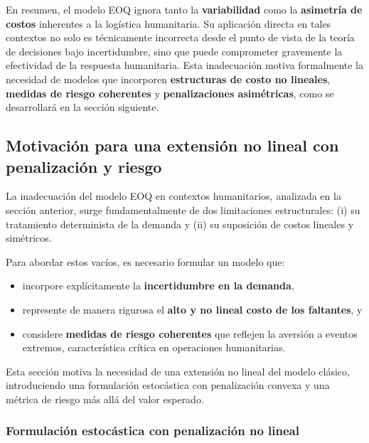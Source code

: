 \documentclass[
  spanish,
  us-letterpaper,
]{scrreprt}
\providecommand{\tightlist}{%
  \setlength{\itemsep}{0pt}\setlength{\parskip}{0pt}}
\numberwithin{equation}{section}
\begin{document}
En resumen, el modelo EOQ ignora tanto la \textbf{variabilidad} como la
\textbf{asimetría de costos} inherentes a la logística humanitaria. Su
aplicación directa en tales contextos no solo es técnicamente incorrecta
desde el punto de vista de la teoría de decisiones bajo incertidumbre,
sino que puede comprometer gravemente la efectividad de la respuesta
humanitaria. Esta inadecuación motiva formalmente la necesidad de
modelos que incorporen \textbf{estructuras de costo no lineales},
\textbf{medidas de riesgo coherentes} y \textbf{penalizaciones
asimétricas}, como se desarrollará en la sección siguiente.

\subsection{Motivación para una extensión no lineal con penalización y
riesgo}\label{motivaciuxf3n-para-una-extensiuxf3n-no-lineal-con-penalizaciuxf3n-y-riesgo}

La inadecuación del modelo EOQ en contextos humanitarios, analizada en
la sección anterior, surge fundamentalmente de dos limitaciones
estructurales: (i) su tratamiento determinista de la demanda y (ii) su
suposición de costos lineales y simétricos.

Para abordar estos vacíos, es necesario formular un modelo que:

\begin{itemize}
\tightlist
\item
  incorpore explícitamente la \textbf{incertidumbre en la demanda},\\
\item
  represente de manera rigurosa el \textbf{alto y no lineal costo de los
  faltantes}, y\\
\item
  considere \textbf{medidas de riesgo coherentes} que reflejen la
  aversión a eventos extremos, característica crítica en operaciones
  humanitarias.
\end{itemize}

Esta sección motiva la necesidad de una extensión no lineal del modelo
clásico, introduciendo una formulación estocástica con penalización
convexa y una métrica de riesgo más allá del valor esperado.

\subsubsection{Formulación estocástica con penalización no
lineal}\label{formulaciuxf3n-estocuxe1stica-con-penalizaciuxf3n-no-lineal}
\end{document}
